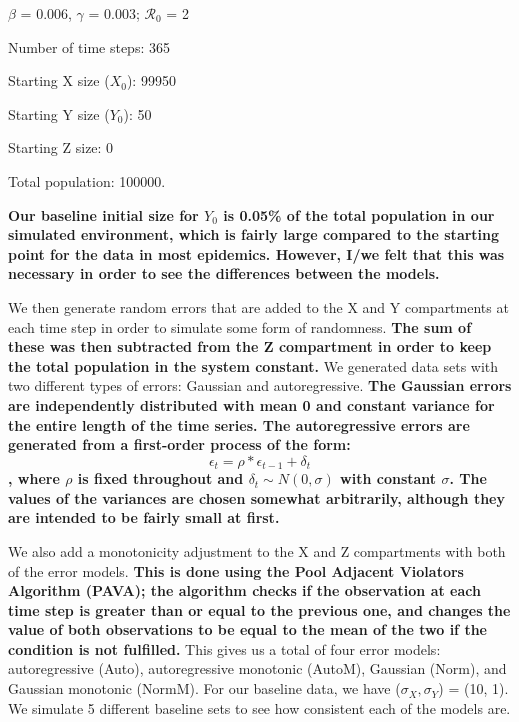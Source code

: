 \documentclass[12pt]{article}
\newcommand{\rr}{\ensuremath{\mathcal{R}_0}}
\begin{document}
\begin{center}
	
	$\beta$ = 0.006, $\gamma$ = 0.003; $\rr$ = 2
	
	Number of time steps: 365
	
	Starting X size ($X_0$): 99950
	
	Starting Y size ($Y_0$): 50
	
	Starting Z size: 0
	
	Total population: 100000.
	
\end{center}


\textbf{Our baseline initial size for $Y_0$ is 0.05\% of the total population in our simulated environment, which is fairly large compared to the starting point for the data in most epidemics. However, I/we felt that this was necessary in order to see the differences between the models.}

We then generate random errors that are added to the X and Y compartments at each time step in order to simulate some form of randomness. \textbf{The sum of these was then subtracted from the Z compartment in order to keep the total population in the system constant.} We generated data sets with two different types of errors: Gaussian and autoregressive. \textbf{The Gaussian errors are independently distributed with mean 0 and constant variance for the entire length of the time series. The autoregressive errors are generated from a first-order process of the form: $$ \epsilon_{t} = \rho * \epsilon_{t-1} + \delta_{t}$$, where $\rho$ is fixed throughout and $\delta_{t} \sim N(0, \sigma)$ with constant $\sigma$. The values of the variances are chosen somewhat arbitrarily, although they are intended to be fairly small at first.} 

We also add a monotonicity adjustment to the X and Z compartments with both of the error models. \textbf{This is done using the Pool Adjacent Violators Algorithm (PAVA); the algorithm checks if the observation at each time step is greater than or equal to the previous one, and changes the value of both observations to be equal to the mean of the two if the condition is not fulfilled.} This gives us a total of four error models: autoregressive (Auto), autoregressive monotonic (AutoM), Gaussian (Norm), and Gaussian monotonic (NormM). For our baseline data, we have ($\sigma_X, \sigma_Y$) = (10, 1). We simulate 5 different baseline sets to see how consistent each of the models are.
\end{document}
